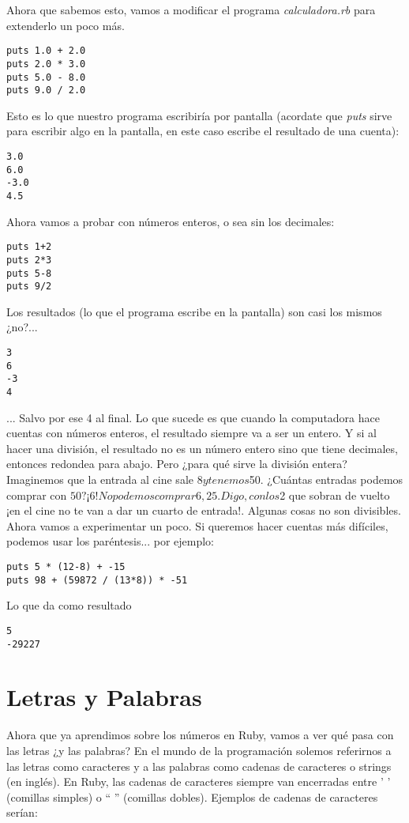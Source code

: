 Ahora que sabemos esto, vamos a modificar el programa \emph{calculadora.rb} para extenderlo un poco más. 

\begin{lstlisting}
puts 1.0 + 2.0
puts 2.0 * 3.0
puts 5.0 - 8.0
puts 9.0 / 2.0
\end{lstlisting}

Esto es lo que nuestro programa escribiría por pantalla (acordate que \emph{puts} sirve para escribir algo en la pantalla, en este caso escribe el resultado de una cuenta):
\begin{lstlisting}
3.0
6.0
-3.0
4.5
\end{lstlisting}

Ahora vamos a probar con números enteros, o sea sin los decimales:

\begin{lstlisting}
puts 1+2
puts 2*3
puts 5-8
puts 9/2
\end{lstlisting}

Los resultados (lo que el programa escribe en la pantalla) son casi los mismos ¿no?...

\begin{lstlisting}
3
6
-3
4
\end{lstlisting}

... Salvo por ese 4 al final. Lo que sucede es que cuando la computadora hace cuentas con números enteros, el resultado siempre va a ser un entero. Y si  al hacer una división, el resultado no es un número entero sino que tiene decimales, entonces redondea para abajo. Pero ¿para qué sirve la división entera?\\

Imaginemos que la entrada al cine sale $8 y tenemos $50. ¿Cuántas entradas podemos comprar con $50? ¡6! No podemos comprar 6,25. Digo, con los $2 que sobran de vuelto ¡en el cine no te van a dar un cuarto de entrada!. Algunas cosas no son divisibles.\\

Ahora vamos a experimentar un poco. Si queremos hacer cuentas más difíciles, podemos usar los paréntesis... por ejemplo:

\begin{lstlisting}
puts 5 * (12-8) + -15
puts 98 + (59872 / (13*8)) * -51
\end{lstlisting}

Lo que da como resultado
\begin{lstlisting}
5
-29227
\end{lstlisting}

\section{Letras y Palabras}
Ahora que ya aprendimos sobre los números en Ruby, vamos a ver qué pasa con las letras ¿y las palabras? En el mundo de la programación solemos referirnos a las letras como caracteres y a las palabras como cadenas de caracteres o strings (en inglés). En Ruby, las cadenas de caracteres siempre van encerradas entre ' ' (comillas simples) o “ ” (comillas dobles). Ejemplos de cadenas de caracteres serían:


